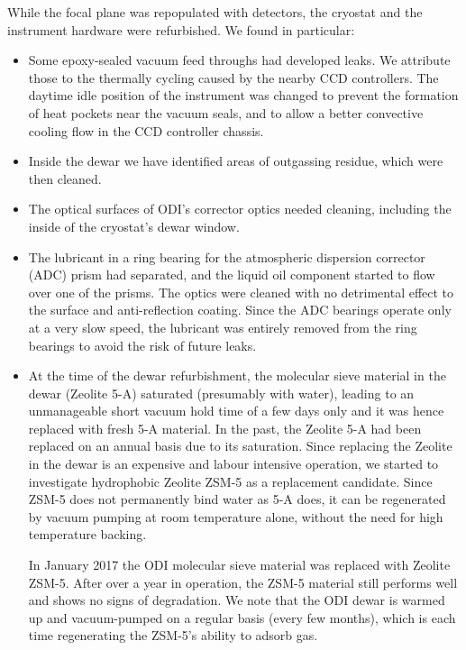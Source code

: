 \documentclass[]{spieman}
\begin{document}
While the focal plane was repopulated with detectors, the cryostat and the 
instrument hardware were refurbished. We found in particular:
\begin{itemize}
	\item Some epoxy-sealed vacuum feed throughs had developed  leaks. We 
	attribute those to the thermally cycling caused by the nearby CCD controllers. 
	The daytime idle position of the instrument was changed to prevent the 
	formation of heat pockets near the vacuum seals, and to allow a better
	convective cooling flow in the CCD controller chassis.
	
	\item Inside the dewar we have identified areas of outgassing residue, which 
	were then cleaned.

	\item The optical surfaces of ODI's corrector optics needed cleaning,
	 including the inside of the cryostat's dewar window. 
	
	\item The lubricant in a ring bearing for the atmospheric dispersion 
	corrector (ADC) prism had separated, and the liquid oil component started to 
	flow over one of the prisms. The optics were cleaned with no detrimental effect 
	to the surface and anti-reflection coating. Since the ADC bearings operate 
	only at a very slow speed, the lubricant was entirely removed from the 
	ring bearings to avoid the risk of future leaks. 
	

\item  At the time of the dewar refurbishment, the molecular sieve material in
the dewar (Zeolite 5-A) saturated (presumably with water), leading to an
unmanageable short vacuum hold time of a few days only and it was hence replaced
with fresh 5-A material. In the past, the Zeolite 5-A had been replaced on an
annual basis due to its saturation. Since replacing the Zeolite in the dewar is
an expensive and labour intensive operation, we started to investigate
hydrophobic Zeolite ZSM-5 as a replacement candidate. Since ZSM-5 does not
permanently bind water as 5-A does, it can be regenerated by vacuum pumping at
room temperature alone, without the need for high temperature backing.

In January 2017 the ODI molecular sieve material was replaced with Zeolite
ZSM-5. After over a year in operation, the ZSM-5 material still performs well
and shows no signs of degradation. We note that the ODI dewar is warmed up and
vacuum-pumped on a regular basis (every few months), which is each time
regenerating the ZSM-5's ability to adsorb gas.

\end{itemize}
\end{document}
